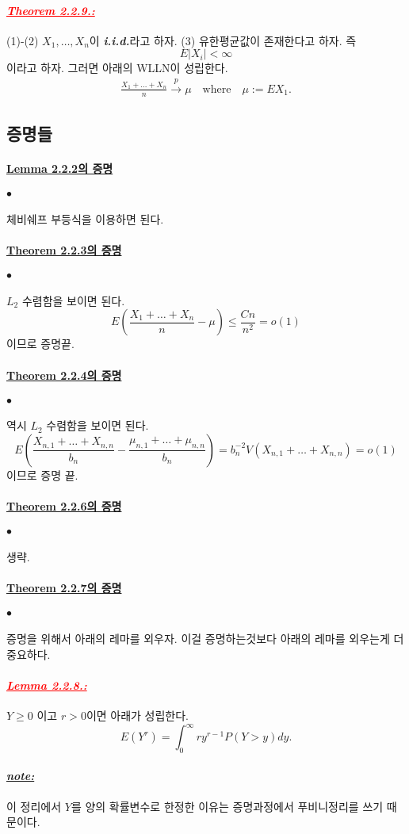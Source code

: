 \documentclass[12pt,oneside,english,a4paper]{article}
\def\ck{\paragraph{\Large$\bullet$}\Large}
\def\note{\paragraph{\Large\textit{\underline{note:}}}\Large}
\newcommand{\parared}[1]{\paragraph{\Large\textcolor{red}{\it\underline{\textbf{#1:}}}}\Large}
\begin{document}
\parared{Theorem 2.2.9.} (1)-(2) $X_1,\dots,X_n$이 \textbf{\emph{i.i.d.}}라고 하자. (3) 유한평균값이 존재한다고 하자. 즉 
\[
E|X_i|<\infty
\]
이라고 하자. 그러면 아래의 WLLN이 성립한다. 
\begin{align*}
\frac{X_1+\dots+X_n}{n} \overset{p}{\to} \mu \quad \mbox{where} \quad \mu:=EX_1.
\end{align*}

\subsection{증명들}

\paragraph{\underline{\LARGE Lemma 2.2.2의 증명}}
\ck 체비쉐프 부등식을 이용하면 된다. 

\paragraph{\underline{\LARGE Theorem 2.2.3의 증명}}
\ck $L_2$ 수렴함을 보이면 된다. 
\[
E\left(\frac{X_1+\dots+X_n}{n}-\mu\right)\leq\frac{Cn}{n^2}=o(1)
\]
이므로 증명끝. 

\paragraph{\underline{\LARGE Theorem 2.2.4의 증명}}
\ck 역시 $L_2$ 수렴함을 보이면 된다. 
\[
E\left(\frac{X_{n,1}+\dots+X_{n,n}}{b_n}-\frac{\mu_{n,1}+\dots+\mu_{n,n}}{b_n}\right)=b_n^{-2}V(X_{n,1}+\dots+X_{n,n})=o(1)
\]
이므로 증명 끝. 

\paragraph{\underline{\LARGE Theorem 2.2.6의 증명}}
\ck 생략.

\paragraph{\underline{\LARGE Theorem 2.2.7의 증명}}
\ck 증명을 위해서 아래의 레마를 외우자. 이걸 증명하는것보다 아래의 레마를 외우는게 더 중요하다. 

\parared{Lemma 2.2.8.} $Y\geq 0$ 이고 $r>0$이면 아래가 성립한다. 
\[
E(Y^r)=\int_0^{\infty}ry^{r-1}P(Y>y)dy.
\]
\note 이 정리에서 $Y$를 양의 확률변수로 한정한 이유는 증명과정에서 푸비니정리를 쓰기 때문이다. 
\end{document}
